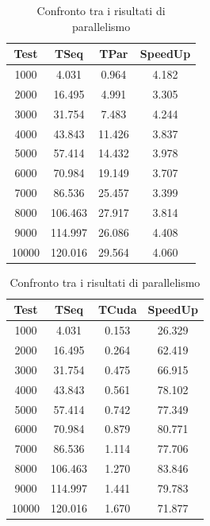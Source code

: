 \documentclass[11pt]{article}
\begin{document}
\begin{table}[!ht]
        \centering
        \begin{subtable}{0.45\textwidth}
            \centering
            \begin{tabular}{|c|c|c|c|}
                \hline
                Test & TSeq & TPar & SpeedUp \\ \hline
                1000 & 4.031 & 0.964 & 4.182 \\ \hline
                2000 & 16.495 & 4.991 & 3.305 \\ \hline
                3000 & 31.754 & 7.483 & 4.244 \\ \hline
                4000 & 43.843 & 11.426 & 3.837 \\ \hline
                5000 & 57.414 & 14.432 & 3.978 \\ \hline
                6000 & 70.984 & 19.149 & 3.707 \\ \hline
                7000 & 86.536 & 25.457 & 3.399 \\ \hline
                8000 & 106.463 & 27.917 & 3.814 \\ \hline
                9000 & 114.997 & 26.086 & 4.408 \\ \hline
                10000 & 120.016 & 29.564 & 4.060 \\ \hline
            \end{tabular}
            \caption{Risultati parallelo 6}\label{tab:table-parallel6}
        \end{subtable}
        \hfill
        \begin{subtable}{0.45\textwidth}
            \centering
            \begin{tabular}{|c|c|c|c|}
                \hline
                Test & TSeq & TCuda & SpeedUp \\ \hline
                1000 & 4.031 & 0.153 & 26.329 \\ \hline
                2000 & 16.495 & 0.264 & 62.419 \\ \hline
                3000 & 31.754 & 0.475 & 66.915 \\ \hline
                4000 & 43.843 & 0.561 & 78.102 \\ \hline
                5000 & 57.414 & 0.742 & 77.349 \\ \hline
                6000 & 70.984 & 0.879 & 80.771 \\ \hline
                7000 & 86.536 & 1.114 & 77.706 \\ \hline
                8000 & 106.463 & 1.270 & 83.846 \\ \hline
                9000 & 114.997 & 1.441 & 79.783 \\ \hline
                10000 & 120.016 & 1.670 & 71.877 \\ \hline
            \end{tabular}
            \caption{Risultati CUDA}\label{tab:table-cuda}
        \end{subtable}
        \caption{Confronto tra i risultati di parallelismo}\label{tab:table-comparison}
    \end{table}
\end{document}
